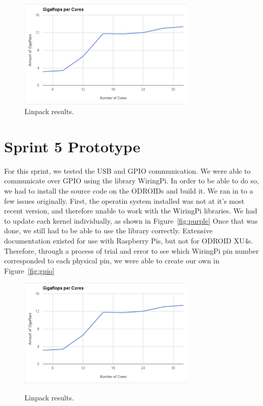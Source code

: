 \begin{figure}[tbh]
	\caption{Linpack results.}
	\centering
		\includegraphics[width=0.75\textwidth]{minimalgraph.JPG}
\end{figure}

\section{Sprint 5 Prototype}

For this sprint, we tested the USB and GPIO communication. We were able to communicate over GPIO using the library WiringPi. In order to be able to do so, we had to install the source code on the ODROIDs and build it. We ran in to a few issues originally. First, the operatin system installed was not at it's most recent version, and therefore unable to work with the WiringPi libraries. We had to update each kernel individually, as shown in Figure~\ref{fig:purple} Once that was done, we still had to be able to use the library correctly. Extensive documentation existed for use with Raspberry Pis, but not for ODROID XU4s. Therefore, through a process of trial and error to see which WiringPi pin number corresponded to each physical pin, we were able to create our own in Figure~\ref{fig:gpio} 

\begin{figure}[tbh]
	\caption{Linpack results.}
	\centering
		\includegraphics[width=0.75\textwidth]{minimalgraph.JPG}
	\label{fig:minimal}
\end{figure}

